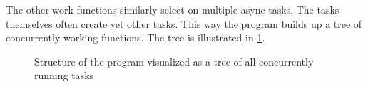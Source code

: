 The other work functions similarly select on multiple async tasks. The tasks themselves often create yet other tasks. This way the program builds up a tree of concurrently working functions. The tree is illustrated in \cref{fig:tree}.

\begin{figure}[htbp]
	\centering
	
	\caption{Structure of the program visualized as a tree of all concurrently running tasks}
	\label{fig:tree}
\end{figure}
%
